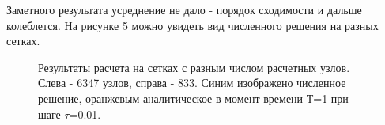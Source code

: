\documentclass[14pt]{article}
\begin{document}
Заметного результата усреднение не дало - порядок сходимости и дальше колеблется. На рисунке 5 можно увидеть вид численного решения на разных сетках.
\begin{figure}[!h!]
\caption{Результаты расчета на сетках с разным числом расчетных узлов. Слева - 6347 узлов, справа - 833. Синим изображено численное решение, оранжевым аналитическое в момент времени Т=1 при шаге $\tau$=0.01.}
\end{figure}
\newpage
\end{document}
